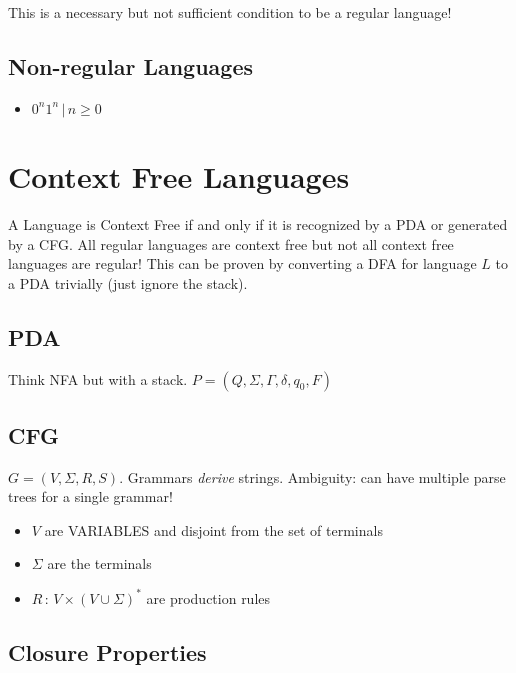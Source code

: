 This is a necessary but not sufficient condition to be a regular language!

\subsection{Non-{}regular Languages}
\label{non-regularlanguages}

\begin{itemize}
\item $0^n1^n\, |\, n\geq 0 $

\end{itemize}

\section{Context Free Languages}
\label{contextfreelanguages}

A Language is Context Free if and only if it is recognized by a PDA or generated by a CFG. All regular languages are context free but not all context free languages are regular! This can be proven by converting a DFA for language $L$ to a PDA trivially (just ignore the stack).

\subsection{PDA}
\label{pda}

Think NFA but with a stack. $P = (Q, \Sigma, \Gamma, \delta, q_0, F)$

\subsection{CFG}
\label{cfg}

$ G = (V, \Sigma, R, S) $. Grammars \emph{derive} strings. Ambiguity: can have multiple parse trees for a single grammar!

\begin{itemize}
\item $V$ are VARIABLES and disjoint from the set of terminals

\item $\Sigma$ are the terminals

\item $R\, :\, V \times (V \cup \Sigma)^*$ are production rules

\end{itemize}

\subsection{Closure Properties}
\label{closureproperties}

